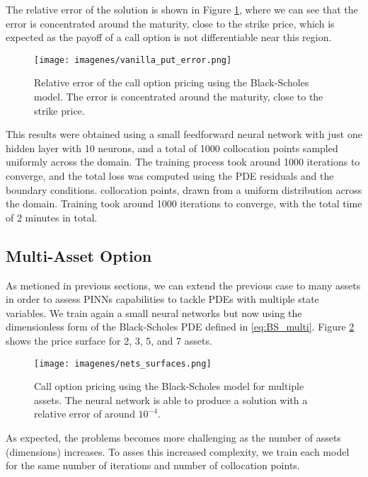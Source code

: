 \documentclass[12pt]{report} %
\theoremstyle{plain}           %
\theoremstyle{definition}      %
\theoremstyle{remark}          %
\begin{document}
The relative error of the solution is shown in Figure \ref{fig:call_option_error}, where we can see that the error is concentrated around the maturity, close to the strike price,
which is expected as the payoff of a call option is not differentiable near this region.

\begin{figure}[H]
	\centering
	\texttt{[image: imagenes/vanilla\_put\_error.png]}
	\caption{Relative error of the call option pricing using the Black-Scholes model. The error is concentrated around the maturity, close to the strike price.}
	\label{fig:call_option_error}
\end{figure}

This results were obtained using a small feedforward neural network with just one hidden layer with 10 neurons, 
and a total of 1000 collocation points sampled uniformly across the domain. The training process took around 1000 iterations to converge, and the total loss was computed using the PDE residuals and the boundary conditions.
collocation points, drawn from a uniform distribution across the domain. Training took around 1000 iterations to converge, 
with the total time of 2 minutes in total. 

\subsection{Multi-Asset Option}

As metioned in previous sections, we can extend the previous case to many assets in order to assess PINNs
capabilities to tackle PDEs with multiple state variables. We train again a small neural networks but now
using the dimensionless form of the Black-Scholes PDE defined in \eqref{eq:BS_multi}. Figure \ref{fig:multi_asset_call} shows the price surface 
for 2, 3, 5, and 7 assets.

\begin{figure}[H]
	\centering
	\texttt{[image: imagenes/nets\_surfaces.png]}
	\caption{Call option pricing using the Black-Scholes model for multiple assets. The neural network is able to produce a solution with a relative error of around $10^{-4}$.}
	\label{fig:multi_asset_call}
\end{figure}

As expected, the problems becomes more challenging as the number of assets (dimensions) increases. To asses this increased complexity, we train each
model for the same number of iterations and number of collocation points. 
\end{document}

